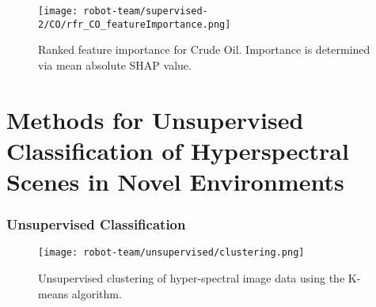 \begin{figure}[h]
    \texttt{[image: robot-team/supervised-2/CO/rfr\_CO\_featureImportance.png]}
    \caption{Ranked feature importance for Crude Oil. Importance is determined via mean absolute SHAP value. \label{CO_shapely}}
\end{figure}






\section{Methods for Unsupervised Classification of Hyperspectral Scenes in Novel Environments}

\subsubsection{Unsupervised Classification}
\begin{figure}[h]
  \texttt{[image: robot-team/unsupervised/clustering.png]}
  \caption{Unsupervised clustering of hyper-spectral image data using the K-means algorithm.\label{clustering}}
\end{figure}



